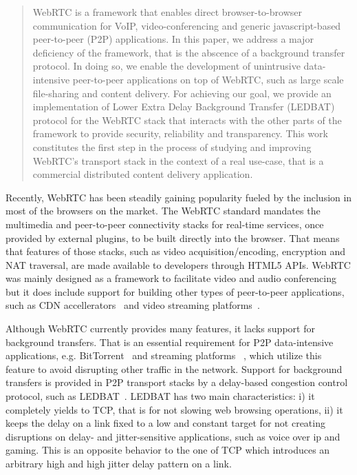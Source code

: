 \documentclass{sig-alternate}
\begin{document}
\begin{abstract}
  WebRTC is a framework that enables direct browser-to-browser communication for VoIP,
  video-conferencing and generic javascript-based peer-to-peer (P2P) applications. In this
  paper, we address a major deficiency of the framework, that is the abscence of a
  background transfer protocol. In doing so, we enable the development of unintrusive
  data-intensive peer-to-peer applications on top of WebRTC, such as large scale
  file-sharing and content delivery.  For achieving our goal, we provide an implementation
  of Lower Extra Delay Background Transfer (LEDBAT) protocol for the WebRTC stack that
  interacts with the other parts of the framework to provide security, reliability and
  transparency.  This work constitutes the first step in the process of studying and improving
  WebRTC's transport stack in the context of a real use-case, that is a commercial
  distributed content delivery application.

\end{abstract}


Recently, WebRTC has been steadily gaining popularity fueled by the inclusion in most of
the browsers on the market. The WebRTC standard mandates the multimedia and peer-to-peer
connectivity stacks for real-time services, once provided by external plugins, to be built
directly into the browser. That means that features of those stacks, such as video
acquisition/encoding, encryption and NAT traversal, are made available to developers
through HTML5 APIs. WebRTC was mainly designed as a framework to facilitate video and
audio conferencing but it does include support for building other types of peer-to-peer
applications, such as CDN accellerators~\cite{peerCDN} and video streaming
platforms~\cite{nurminen2013p2p}.

Although WebRTC currently provides many features, it lacks support for background
transfers. That is an essential requirement for P2P data-intensive applications,
e.g. BitTorrent~\cite{bittorrent} and streaming platforms ~\cite{smoothcache}, which
utilize this feature to avoid disrupting other traffic in the network. Support for background
transfers is provided in P2P transport stacks by a delay-based congestion control protocol,
such as LEDBAT~\cite{ledbat-rfc}. LEDBAT has two main characteristics: i) it completely
yields to TCP, that is for not slowing web browsing operations, ii) it keeps the delay on a link fixed
to a low and constant target for not creating disruptions on delay- and jitter-sensitive 
applications, such as voice over ip and gaming. This is an opposite behavior to the one of
TCP which introduces an arbitrary high and high jitter delay pattern on a link.  
\end{document}
